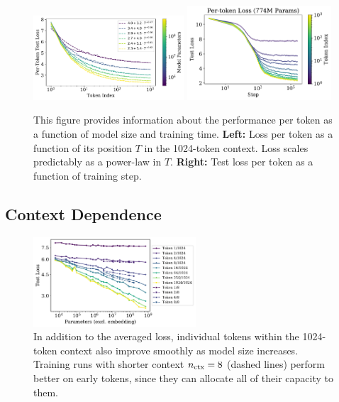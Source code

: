 \documentclass[english]{article}
\begin{document}
\begin{figure}
\noindent \centering{} \includegraphics[width=0.50\textwidth]{ContextPowerLaw} 
\includegraphics[width=0.48\textwidth]{SingleRunTokenTraining}  \caption[Power-law dependence of performance on position in context]{ This figure provides information about the performance per token as a function of model size and training time.  {\bf Left:} Loss per token as a function of its position $T$ in the 1024-token context.  Loss scales predictably as a power-law in $T$.  {\bf Right: } Test loss per token as a function of training step.  \label{fig:MoreTokenAnalysis}}
\end{figure}



\subsection{Context Dependence}
\label{sec:ContextDependence}

\begin{figure}
\noindent \centering{}  \includegraphics[width=0.54\textwidth]{PerformancevsModelSizevsContext}  \caption[Performance at different context positions versus model size]{In addition to the averaged loss, individual tokens within the 1024-token context also improve smoothly as model size increases.  Training runs with shorter context $n_{\rm ctx} = 8$ (dashed lines) perform better on early tokens, since they can allocate all of their capacity to them.  \label{fig:PerformancevsModelSizevsContext}}
\end{figure}
\end{document}

